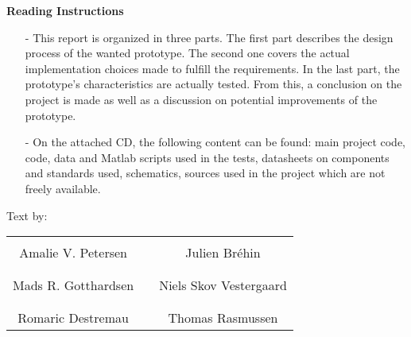 \textbf{Reading Instructions}
\vspace{-10 pt}
\begin{itemize}
\item[-] This report is organized in three parts. The first part describes the design process of the wanted prototype. The second one covers the actual implementation choices made to fulfill the requirements. In the last part, the prototype's characteristics are actually tested. From this, a conclusion on the project is made as well as a discussion on potential improvements of the prototype.
\item[-] On the attached CD, the following content can be found: main project code, code, data and Matlab scripts used in the tests, datasheets on components and standards used, schematics, sources used in the project which are not freely available.
\end{itemize}
%
Text by:\\
\vspace{-12 pt}
\begin{table}[H]
	\centering
		\begin{tabular}{c c c}
			\underline{\phantom{JAERJAERJAERJAERGO}} & \phantom{cookies} & \underline{\phantom{JAERJAERJAERJAERGO}} \\
			Amalie V. Petersen			& \phantom{cookies} & Julien Br\'ehin		\\
			&&\\
			\underline{\phantom{JAERJAERJAERJAERGO}} & \phantom{cookies} & \underline{\phantom{JAERJAERJAERJAERGO}} \\
			Mads R. Gotthardsen			& \phantom{cookies} & Niels Skov Vestergaard		\\
			&&\\
	    	\underline{\phantom{JAERJAERJAERJAERGO}} & \phantom{cookies} & \underline{\phantom{JAERJAERJAERJAERGO}} \\
			Romaric Destremau 					& \phantom{cookies} & Thomas Rasmussen 			\\			
		\end{tabular}
\end{table}